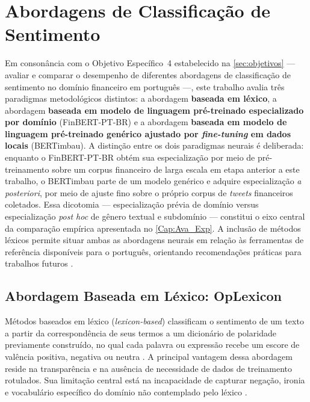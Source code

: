 
\section{Abordagens de Classificação de Sentimento}
\label{sec:abordagens}

Em consonância com o Objetivo Específico~4 estabelecido na \autoref{sec:objetivos} — avaliar e comparar o desempenho de diferentes abordagens de classificação de sentimento no domínio financeiro em português —, este trabalho avalia três paradigmas metodológicos distintos: a abordagem \textbf{baseada em léxico}, a abordagem \textbf{baseada em modelo de linguagem pré-treinado especializado por domínio} (FinBERT-PT-BR) e a abordagem \textbf{baseada em modelo de linguagem pré-treinado genérico ajustado por \textit{fine-tuning} em dados locais} (BERTimbau). A distinção entre os dois paradigmas neurais é deliberada: enquanto o FinBERT-PT-BR obtém sua especialização por meio de pré-treinamento sobre um corpus financeiro de larga escala em etapa anterior a este trabalho, o BERTimbau parte de um modelo genérico e adquire especialização \textit{a posteriori}, por meio de ajuste fino sobre o próprio corpus de \textit{tweets} financeiros coletados. Essa dicotomia --- especialização prévia de domínio versus especialização \textit{post hoc} de gênero textual e subdomínio --- constitui o eixo central da comparação empírica apresentada no \autoref{Cap:Ava_Exp}. A inclusão de métodos léxicos permite situar ambas as abordagens neurais em relação às ferramentas de referência disponíveis para o português, orientando recomendações práticas para trabalhos futuros \cite{kearney2014,sousa2025}.


\subsection{Abordagem Baseada em Léxico: OpLexicon}
\label{subsec:abordagem_lexica}

Métodos baseados em léxico (\textit{lexicon-based}) classificam o sentimento de um texto a partir da correspondência de seus termos a um dicionário de polaridade previamente construído, no qual cada palavra ou expressão recebe um escore de valência positiva, negativa ou neutra \cite{liu2020survey}. A principal vantagem dessa abordagem reside na transparência e na ausência de necessidade de dados de treinamento rotulados. Sua limitação central está na incapacidade de capturar negação, ironia e vocabulário específico do domínio não contemplado pelo léxico \cite{loughran2011,kearney2014}.

